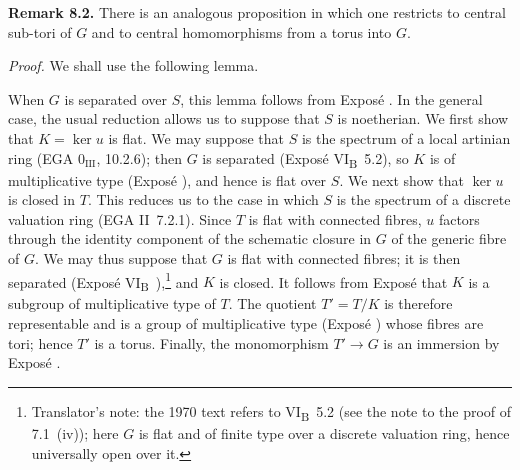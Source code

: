 \medskip\noindent\textbf{Remark 8.2.}
There is an analogous proposition in which one restricts to central
sub-tori of \(G\) and to central homomorphisms from a torus into \(G\).

\medskip\noindent\textit{Proof.}
We shall use the following lemma.


When \(G\) is separated over \(S\), this lemma follows from
Exposé . In the general case, the usual reduction allows us to
suppose that \(S\) is noetherian. We first show that
\(K=\ker u\) is flat. We may suppose that \(S\) is the spectrum of a
local artinian ring (EGA \(0_{\mathrm{III}}\), 10.2.6); then \(G\) is
separated (Exposé VI\textsubscript{B}~5.2), so \(K\) is of
multiplicative type (Exposé ), and hence is flat over \(S\).
We next show that \(\ker u\) is closed in \(T\). This reduces us to
the case in which \(S\) is the spectrum of a discrete valuation ring
(EGA II~7.2.1). Since \(T\) is flat with connected fibres, \(u\)
factors through the identity component of the schematic closure in
\(G\) of the generic fibre of \(G\). We may thus suppose that \(G\)
is flat with connected fibres; it is then separated
(Exposé VI\textsubscript{B}~),\footnote{Translator's note: the 1970 text
refers to VI\textsubscript{B}~5.2 (see the note to the proof of 7.1~(iv)); here
\(G\) is flat and of finite type over a discrete valuation ring, hence
universally open over it.} and \(K\) is closed.
It follows from Exposé  that \(K\) is a subgroup of
multiplicative type of \(T\). The quotient \(T'=T/K\) is therefore
representable and is a group of multiplicative type
(Exposé ) whose fibres are tori; hence \(T'\) is a torus.
Finally, the monomorphism \(T'\to G\) is an immersion by
Exposé .


